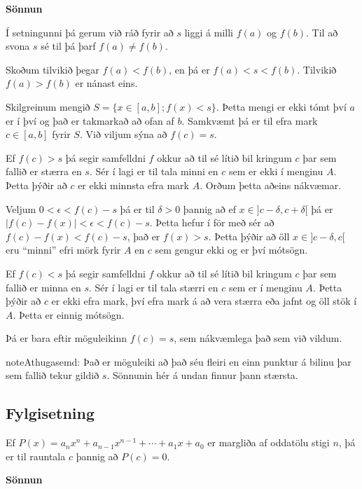\documentclass[b5paper,11pt,icelandic]{sphinxmanual}
\begin{document}
\textbf{Sönnun}

Í setningunni þá gerum við ráð fyrir að \(s\) liggi á milli \(f(a)\) og
\(f(b)\). Til að svona \(s\) sé til þá þarf \(f(a) \neq f(b)\).

Skoðum tilvikið þegar \(f(a) < f(b)\), en þá er \(f(a) < s < f(b)\).
Tilvikið \(f(a)>f(b)\) er nánast eins.

Skilgreinum mengið \(S = \{ x \in [a,b] ; f(x) < s\}\). Þetta mengi er ekki tómt
því \(a\) er í því og það er takmarkað að ofan af \(b\). Samkvæmt
{\hyperref[kafli01:frumsendanumeframark]{}} þá er til efra mark \(c \in[a,b]\)
fyrir \(S\). Við viljum sýna að \(f(c)=s\).

Ef \(f(c)>s\) þá segir samfelldni \(f\)
okkur að til sé lítið bil kringum \(c\) þar sem fallið er stærra en \(s\). Sér í lagi er
til tala minni en \(c\) sem er ekki í menginu \(A\). Þetta þýðir að \(c\) er
ekki minnsta efra mark \(A\). Orðum þetta aðeins nákvæmar.

Veljum \(0<\epsilon < f(c)-s\) þá er til \(\delta>0\) þannig að ef \(x\in ]c-\delta,c+\delta[\)
þá er \(|f(c)-f(x)|<\epsilon < f(c) -s\). Þetta hefur í för með sér að \(f(c) - f(x) < f(c) -s\),
það er \(f(x)>s\). Þetta þýðir að öll \(x\in]c-\delta,c[\) eru ``minni'' efri mörk fyrir \(A\)
en \(c\) sem gengur ekki og er því mótsögn.

Ef \(f(c)<s\) þá segir samfelldni \(f\) okkur að til sé lítið bil kringum \(c\)
þar sem fallið er minna en \(s\). Sér í lagi  er til tala stærri en \(c\) sem er í menginu
\(A\). Þetta þýðir að \(c\) er ekki efra mark, því efra mark á að vera stærra eða jafnt
og öll stök í \(A\). Þetta er einnig mótsögn.

Þá er bara eftir möguleikinn \(f(c)=s\), sem nákvæmlega það sem við vildum.

\begin{notice}{note}{Athugasemd:}
Það er möguleiki að það séu fleiri en einn punktur á bilinu þar sem fallið tekur
gildið \(s\). Sönnunin hér á undan finnur þann stærsta.
\end{notice}


\subsection{Fylgisetning}
\label{kafli02:fylgisetning}
Ef \(P(x)=a_nx^n+a_{n-1}x^{n-1}+\cdots+a_1x+a_0\) er margliða af
oddatölu stigi \(n\), þá er til rauntala \(c\) þannig að \(P(c)=0\).

\textbf{Sönnun}
\end{document}
